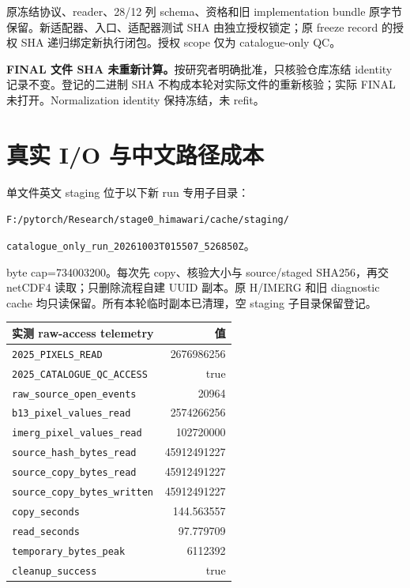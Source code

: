 \documentclass[UTF8,11pt,a4paper,fontset=windows]{ctexart}
\begin{document}
原冻结协议、reader、28/12 列 schema、资格和旧 implementation bundle 原字节保留。新适配器、入口、适配器测试 SHA 由独立授权锁定；原 freeze record 的授权 SHA 递归绑定新执行闭包。授权 scope 仅为 catalogue-only QC。

\textbf{FINAL 文件 SHA 未重新计算。}按研究者明确批准，只核验仓库冻结 identity 记录不变。登记的二进制 SHA 不构成本轮对实际文件的重新核验；实际 FINAL 未打开。Normalization identity 保持冻结，未 refit。
\newpage
\section*{真实 I/O 与中文路径成本}
单文件英文 staging 位于以下新 run 专用子目录：\par
{\small\texttt{F:/pytorch/Research/stage0\_himawari/cache/staging/}}\par
{\small\texttt{catalogue\_only\_run\_20261003T015507\_526850Z}}。

byte cap=734003200。每次先 copy、核验大小与 source/staged SHA256，再交 netCDF4 读取；只删除流程自建 UUID 副本。原 H/IMERG 和旧 diagnostic cache 均只读保留。所有本轮临时副本已清理，空 staging 子目录保留登记。

\begin{tabular}{p{103mm}r}\hline 实测 raw-access telemetry & 值\\\hline
{\scriptsize\texttt{2025\_PIXELS\_READ}} & 2676986256 \\
{\scriptsize\texttt{2025\_CATALOGUE\_QC\_ACCESS}} & true \\
{\scriptsize\texttt{raw\_source\_open\_events}} & 20964 \\
{\scriptsize\texttt{b13\_pixel\_values\_read}} & 2574266256 \\
{\scriptsize\texttt{imerg\_pixel\_values\_read}} & 102720000 \\
{\scriptsize\texttt{source\_hash\_bytes\_read}} & 45912491227 \\
{\scriptsize\texttt{source\_copy\_bytes\_read}} & 45912491227 \\
{\scriptsize\texttt{source\_copy\_bytes\_written}} & 45912491227 \\
{\scriptsize\texttt{copy\_seconds}} & 144.563557 \\
{\scriptsize\texttt{read\_seconds}} & 97.779709 \\
{\scriptsize\texttt{temporary\_bytes\_peak}} & 6112392 \\
{\scriptsize\texttt{cleanup\_success}} & true \\
\hline\end{tabular}
\end{document}
